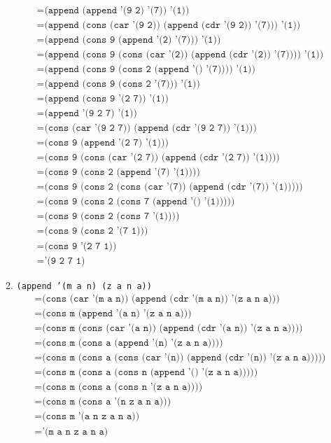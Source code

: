 \documentclass[letterpaper,11pt]{article}
\begin{document}
\begin{enumerate}
\begin{enumerate}
\begin{align*}
            &= \texttt{(append (append '(9 2) '(7)) '(1))} \\
            &= \texttt{(append (cons (car '(9 2)) (append (cdr '(9 2)) '(7))) '(1))} \\
            &= \texttt{(append (cons 9 (append '(2) '(7))) '(1))} \\
            &= \texttt{(append (cons 9 (cons (car '(2)) (append (cdr '(2)) '(7)))) '(1))} \\ 
            &= \texttt{(append (cons 9 (cons 2 (append '() '(7)))) '(1))} \\
            &= \texttt{(append (cons 9 (cons 2 '(7))) '(1))} \\
            &= \texttt{(append (cons 9 '(2 7)) '(1))} \\
            &= \texttt{(append '(9 2 7) '(1))} \\
            &= \texttt{(cons (car '(9 2 7)) (append (cdr '(9 2 7)) '(1)))} \\
            &= \texttt{(cons 9 (append '(2 7) '(1)))} \\
            &= \texttt{(cons 9 (cons (car '(2 7)) (append (cdr '(2 7)) '(1))))} \\
            &= \texttt{(cons 9 (cons 2 (append '(7) '(1))))} \\
            &= \texttt{(cons 9 (cons 2 (cons (car '(7)) (append (cdr '(7)) '(1)))))} \\
            &= \texttt{(cons 9 (cons 2 (cons 7 (append '() '(1)))))} \\
            &= \texttt{(cons 9 (cons 2 (cons 7 '(1))))} \\
            &= \texttt{(cons 9 (cons 2 '(7 1)))} \\
            &= \texttt{(cons 9 '(2 7 1))} \\
            &= \texttt{'(9 2 7 1)}
        \end{align*}

        \item \texttt{(append '(m a n) (z a n a))}
        \begin{align*}
            &= \texttt{(cons (car '(m a n)) (append (cdr '(m a n)) '(z a n a)))} \\
            &= \texttt{(cons m (append '(a n) '(z a n a)))} \\
            &= \texttt{(cons m (cons (car '(a n)) (append (cdr '(a n)) '(z a n a))))} \\
            &= \texttt{(cons m (cons a (append '(n) '(z a n a))))} \\
            &= \texttt{(cons m (cons a (cons (car '(n)) (append (cdr '(n)) '(z a n a)))))} \\
            &= \texttt{(cons m (cons a (cons n (append '() '(z a n a)))))} \\
            &= \texttt{(cons m (cons a (cons n '(z a n a))))} \\
            &= \texttt{(cons m (cons a '(n z a n a)))} \\
            &= \texttt{(cons m '(a n z a n a))} \\
            &= \texttt{'(m a n z a n a)}
        \end{align*}


\end{enumerate}
\end{enumerate}
\end{document}
